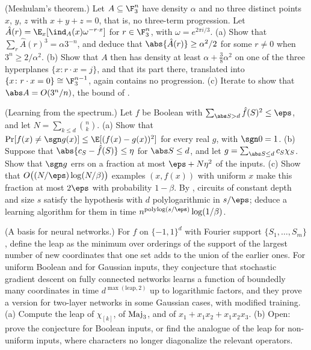 \begin{refsection}
\begin{exercises}
\item \transfer\harder (Meshulam's theorem.) Let $A\subseteq\F_3^n$ have density $\alpha$ and no three distinct points $x$, $y$, $z$ with $x+y+z=0$, that is, no three-term progression. Let $\hat A(r)=\E_x[\ind_A(x)\omega^{-r\cdot x}]$ for $r\in\F_3^n$, with $\omega=e^{2\pi i/3}$. (a) Show that $\sum_r\hat A(r)^3=\alpha3^{-n}$, and deduce that $\abs{\hat A(r)}\ge\alpha^2/2$ for some $r\ne0$ when $3^n\ge2/\alpha^2$. (b) Show that $A$ then has density at least $\alpha+\frac38\alpha^2$ on one of the three hyperplanes $\{x\colon r\cdot x=j\}$, and that its part there, translated into $\{x\colon r\cdot x=0\}\cong\F_3^{n-1}$, again contains no progression. (c) Iterate to show that $\abs A=O(3^n/n)$, the bound of \textcite{Meshulam1995}. \label{ex:fourier:meshulam}

\item \transfer\hard (Learning from the spectrum.) Let $f$ be Boolean with $\sum_{\abs S>d}\hat f(S)^2\le\eps$, and let $N=\sum_{k\le d}\binom nk$. (a) Show that $\Pr[f(x)\ne\sgn g(x)]\le\E[(f(x)-g(x))^2]$ for every real $g$, with $\sgn0=1$. (b) Suppose that $\abs{c_S-\hat f(S)}\le\eta$ for $\abs S\le d$, and let $g=\sum_{\abs S\le d}c_S\chi_S$. Show that $\sgn g$ errs on a fraction at most $\eps+N\eta^2$ of the inputs. (c) Show that $O\bigl((N/\eps)\log(N/\beta)\bigr)$ examples $(x,f(x))$ with uniform $x$ make this fraction at most $2\eps$ with probability $1-\beta$. By \textcite{LinialMansourNisan1993}, circuits of constant depth and size $s$ satisfy the hypothesis with $d$ polylogarithmic in $s/\eps$; deduce a learning algorithm for them in time $n^{\operatorname{polylog}(s/\eps)}\log(1/\beta)$. \label{ex:fourier:lmn}

\item \research\harder (A basis for neural networks.) For $f$ on $\{-1,1\}^d$ with Fourier support $\{S_1,\dots,S_m\}$, \textcite{AbbeBoixAdseraMisiakiewicz2023} define the leap as the minimum over orderings of the support of the largest number of new coordinates that one set adds to the union of the earlier ones. For uniform Boolean and for Gaussian inputs, they conjecture that stochastic gradient descent on fully connected networks learns a function of boundedly many coordinates in time $d^{\max(\mathrm{leap},2)}$ up to logarithmic factors, and they prove a version for two-layer networks in some Gaussian cases, with modified training. (a) Compute the leap of $\chi_{[k]}$, of $\operatorname{Maj}_3$, and of $x_1+x_1x_2+x_1x_2x_3$. (b) Open: prove the conjecture for Boolean inputs, or find the analogue of the leap for non-uniform inputs, where characters no longer diagonalize the relevant operators. \label{ex:fourier:leap}
\end{exercises}


\end{refsection}
